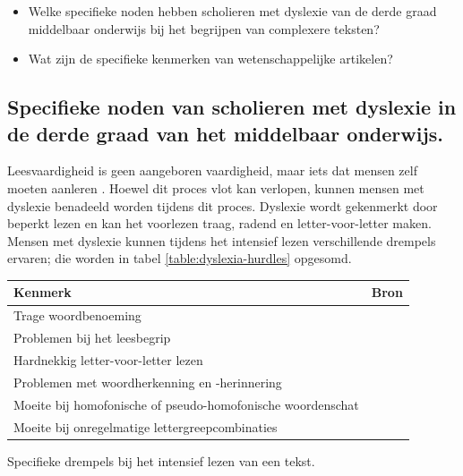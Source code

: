 \begin{itemize}
	\item Welke specifieke noden hebben scholieren met dyslexie van de derde graad middelbaar onderwijs bij het begrijpen van complexere teksten?
	\item Wat zijn de specifieke kenmerken van wetenschappelijke artikelen?
\end{itemize}

\subsection{Specifieke noden van scholieren met dyslexie in de derde graad van het middelbaar onderwijs.}

Leesvaardigheid is geen aangeboren vaardigheid, maar iets dat mensen zelf moeten aanleren \autocite{Bonte2020, VanDerMeer2022}. Hoewel dit proces vlot kan verlopen, kunnen mensen met dyslexie benadeeld worden tijdens dit proces.  Dyslexie wordt gekenmerkt door beperkt lezen en kan het voorlezen traag, radend en letter-voor-letter maken. Mensen met dyslexie kunnen tijdens het intensief lezen verschillende drempels ervaren; die worden in tabel \ref{table:dyslexia-hurdles} opgesomd.

\begin{center}
	\begin{tabular}{ | m{10cm} | m{6cm} | } 
		\hline
		\textbf{Kenmerk} & \textbf{Bron} \\ 
		\hline
		Trage woordbenoeming &  \autocite{Bonte2020} \\
		\hline
		Problemen bij het leesbegrip & \autocite{Gala2016, Bonte2020} \\ 
		\hline
		Hardnekkig letter-voor-letter lezen & \autocite{Bonte2020, Zhang2021} \\ 
		\hline
		Problemen met woordherkenning en -herinnering & \autocite{Bonte2020} \\
		\hline
		Moeite bij homofonische of pseudo-homofonische woordenschat & \autocite{bibid} \\
		\hline
		Moeite bij onregelmatige lettergreepcombinaties & \textcite{Gala2016} \\
		\hline
	\end{tabular}
	\caption{Specifieke drempels bij het intensief lezen van een tekst.}
	\label{table:dyslexia-hurdles}
\end{center}

\medspace



